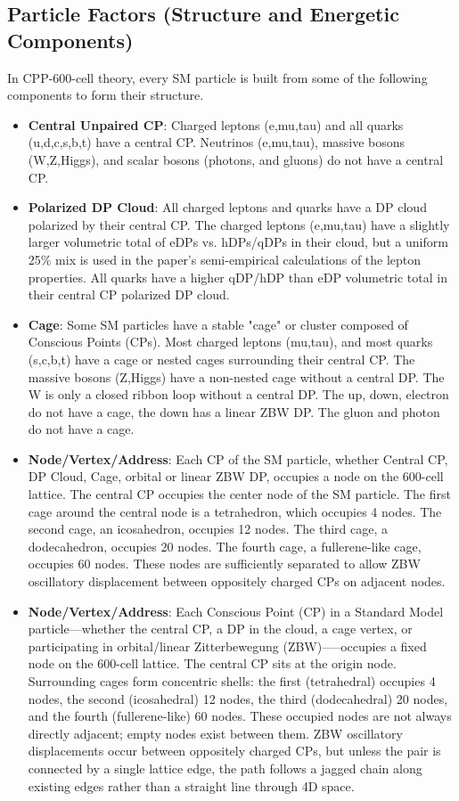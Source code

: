 \documentclass{article}
\begin{document}
\subsection{Particle Factors (Structure and Energetic Components)}
In CPP-600-cell theory, every SM particle is built from some of the following components to form their structure. 
\begin{itemize}
\item{\textbf{Central Unpaired CP}}: Charged leptons (e,mu,tau) and all quarks (u,d,c,s,b,t) have a central CP. Neutrinos (e,mu,tau), massive bosons (W,Z,Higgs), and scalar bosons (photons, and gluons) do not have a central CP. 
\item{\textbf{Polarized DP Cloud}}: All charged leptons and quarks have a DP cloud polarized by their central CP. The charged leptons (e,mu,tau) have a slightly larger volumetric total of eDPs vs. hDPs/qDPs in their cloud, but a uniform 25\% mix is used in the paper's semi-empirical calculations of the lepton properties. All quarks have a higher qDP/hDP than eDP volumetric total in their central CP polarized DP cloud.
\item{\textbf{Cage}}: Some SM particles have a stable "cage" or cluster composed of Conscious Points (CPs). Most charged leptons (mu,tau), and most quarks (s,c,b,t) have a cage or nested cages surrounding their central CP. The massive bosons (Z,Higgs) have a non-nested cage without a central DP. The W is only a closed ribbon loop without a central DP. The up, down, electron do not have a cage, the down has a linear ZBW DP. The gluon and photon do not have a cage. 
\item{\textbf{Node/Vertex/Address}}: Each CP of the SM particle, whether Central CP, DP Cloud, Cage, orbital or linear ZBW DP, occupies a node on the 600-cell lattice. The central CP occupies the center node of the SM particle. The first cage around the central node is a tetrahedron, which occupies 4 nodes. The second cage, an icosahedron, occupies 12 nodes. The third cage, a dodecahedron, occupies 20 nodes. The fourth cage, a fullerene-like cage, occupies 60 nodes. These nodes are sufficiently separated to allow ZBW oscillatory displacement between oppositely charged CPs on adjacent nodes.

\item{\textbf{Node/Vertex/Address}}: Each Conscious Point (CP) in a Standard Model particle—whether the central CP, a DP in the cloud, a cage vertex, or participating in orbital/linear Zitterbewegung (ZBW)—--occupies a fixed node on the 600-cell lattice. The central CP sits at the origin node. Surrounding cages form concentric shells: the first (tetrahedral) occupies 4 nodes, the second (icosahedral) 12 nodes, the third (dodecahedral) 20 nodes, and the fourth (fullerene-like) 60 nodes. These occupied nodes are not always directly adjacent; empty nodes exist between them. ZBW oscillatory displacements occur between oppositely charged CPs, but unless the pair is connected by a single lattice edge, the path follows a jagged chain along existing edges rather than a straight line through 4D space.


\end{itemize}
\end{document}
